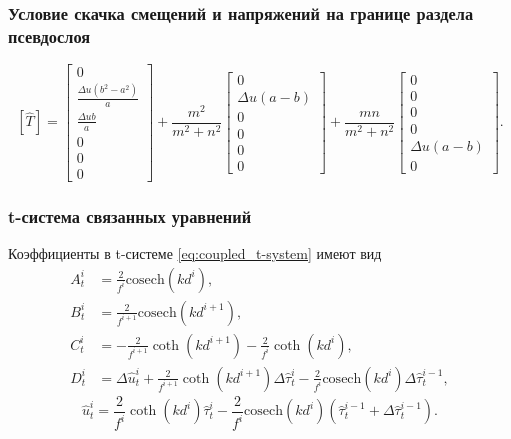 \begin{frame}
    \frametitle{Условие скачка смещений и напряжений на границе раздела псевдослоя}
    \begin{equation*}
        \left[ \hat{T} \right] = 
        \left[ \begin{array}{c} 
            0 \\ \frac{\Delta u(b^2 - a^2)}{a} \\ \frac{\Delta ub}{a} \\ 0 \\ 0 \\ 0 
        \end{array} \right]
        +
        \frac{m^2}{m^2+n^2} \left[ \begin{array}{c} 
            0 \\ \Delta u(a-b) \\ 0 \\ 0 \\ 0 \\ 0 
        \end{array} \right]
        +
        \frac{mn}{m^2+n^2} \left[ \begin{array}{c} 
            0 \\ 0 \\ 0 \\ 0 \\ \Delta u(a-b) \\ 0 
        \end{array} \right].
    \end{equation*}
\end{frame}

\begin{frame}
    \frametitle{t-система связанных уравнений}
    Коэффициенты в t-системе \eqref{eq:coupled_t-system} имеют вид
    \begin{equation*}
        \begin{split}
            A^{i}_t &= \frac{2}{f^{i}}\text{cosech}(kd^{i}),\\
            B^{i}_t &= \frac{2}{f^{i+1}}\text{cosech}(kd^{i+1}),\\
            C^{i}_t &= -\frac{2}{f^{i+1}}\coth(kd^{i+1}) - \frac{2}{f^{i}}\coth(kd^{i}),\\
            D^{i}_t &= \Delta \hat{u}^{i}_{t} + \frac{2}{f^{i+1}}\coth(kd^{i+1})\Delta\hat{\tau}_{t}^{i} 
            - \frac{2}{f^{i}}\text{cosech}(kd^{i})\Delta\hat{\tau}_{t}^{i-1},
        \end{split}
    \end{equation*}
    \begin{equation*}
        \hat{u}^{i}_{t} = \frac{2}{f^{i}}\coth(kd^{i})\hat{\tau}^{i}_{t} - \frac{2}{f^{i}}\text{cosech}(kd^{i}) (\hat{\tau}^{i-1}_{t} + \Delta\hat{\tau}^{i-1}_{t}).
    \end{equation*}
\end{frame}

